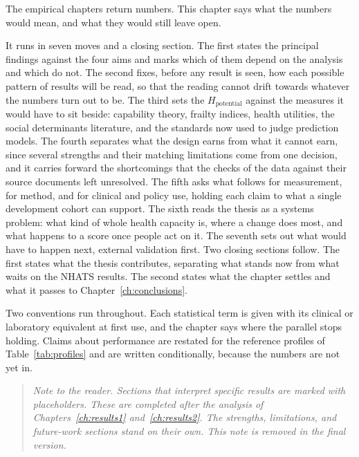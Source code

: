 
\label{ch:discussion}

\begin{ataglance}
The empirical chapters return numbers. This chapter says what the numbers would
mean, and what they would still leave open.

It runs in seven moves and a closing section. The first states the principal
findings against the four aims and marks which of them depend on the analysis and
which do not. The second fixes, before any result is seen, how each possible
pattern of results will be read, so that the reading cannot drift towards
whatever the numbers turn out to be. The third sets the $H_{\text{potential}}$
against the measures it would have to sit beside: capability theory, frailty
indices, health utilities, the social determinants literature, and the standards
now used to judge prediction models. The fourth separates what the design earns
from what it cannot earn, since several strengths and their matching limitations
come from one decision, and it carries forward the shortcomings that the checks of
the data against their source documents left unresolved. The fifth asks what
follows for measurement, for method, and for clinical and policy use, holding each
claim to what a single development cohort can support. The sixth reads the thesis
as a systems problem: what kind of whole health capacity is, where a change does
most, and what happens to a score once people act on it. The seventh sets out what
would have to happen next, external validation first. Two closing sections follow.
The first states what the thesis contributes, separating what stands now from what
waits on the NHATS results. The second states what the chapter settles and what it
passes to Chapter~\ref{ch:conclusions}.

Two conventions run throughout. Each statistical term is given with its clinical
or laboratory equivalent at first use, and the chapter says where the parallel
stops holding. Claims about performance are restated for the reference
profiles of Table~\ref{tab:profiles} and are written conditionally, because the
numbers are not yet in.
\end{ataglance}

\begin{quote}
\small\itshape
Note to the reader. Sections that interpret specific results are marked with placeholders. These are completed after the analysis of Chapters~\ref{ch:results1} and~\ref{ch:results2}. The strengths, limitations, and future-work sections stand on their own. This note is removed in the final version.
\end{quote}

